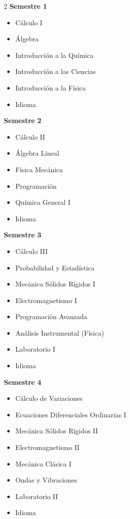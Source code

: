 \documentclass[12pt,a4paper]{article}
\begin{document}
	\begin{multicols}{2}
		\textbf{Semestre 1}
		\begin{itemize}
			\item Cálculo I
			\item Álgebra
			\item Introducción a la Química
			\item Introducción a las Ciencias
			\item Introducción a la Física
			\item Idioma
		\end{itemize}
		
		\textbf{Semestre 2}
		\begin{itemize}
			\item Cálculo II
			\item Álgebra Lineal
			\item Física Mecánica
			\item Programación
			\item Química General I
			\item Idioma
		\end{itemize}
		
		\textbf{Semestre 3}
		\begin{itemize}
			\item Cálculo III
			\item Probabilidad y Estadística
			\item Mecánica Sólidos Rígidos I
			\item Electromagnetismo I
			\item Programación Avanzada
			\item Análisis Instrumental (Física)
			\item Laboratorio I
			\item Idioma
		\end{itemize}
		
		\textbf{Semestre 4}
		\begin{itemize}
			\item Cálculo de Variaciones
			\item Ecuaciones Diferenciales Ordinarias I
			\item Mecánica Sólidos Rígidos II
			\item Electromagnetismo II
			\item Mecánica Clásica I
			\item Ondas y Vibraciones
			\item Laboratorio II
			\item Idioma
		\end{itemize}
		

\end{multicols}
\end{document}
